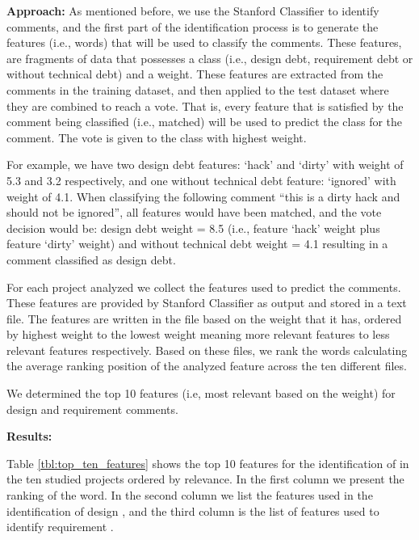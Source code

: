 \vspace{1mm}
\noindent \textbf{Approach:} As mentioned before, we use the Stanford Classifier to identify \SATD comments, and the first part of the identification process is to generate the features (i.e., words) that will be used to classify the comments. These features, are fragments of data that possesses a class (i.e., design debt, requirement debt or without technical debt) and a weight. These features are extracted from the comments in the training dataset, and then applied to the test dataset where they are combined to reach a vote. That is, every feature that is satisfied by the comment being classified (i.e., matched) will be used to predict the class for the comment. The vote is given to the class with highest weight. 

For example, we have two design debt features: `hack' and `dirty' with weight of 5.3 and 3.2 respectively, and one without technical debt feature: `ignored' with weight of 4.1. When classifying the following comment ``this is a dirty hack and should not be ignored'', all features would have been matched, and the vote decision would be: design debt weight = 8.5 (i.e., feature `hack' weight plus feature `dirty' weight) and without technical debt weight = 4.1 resulting in a comment classified as design debt.

For each project analyzed we collect the features used to predict the \SATD comments. These features are provided by Stanford Classifier as output and stored in a text file. The features are written in the file based on the weight that it has, ordered by highest weight to the lowest weight meaning more relevant features to less relevant features respectively. Based on these files, we rank the words calculating the average ranking position of the analyzed feature across the ten different files. 

We determined the top 10 features (i.e, most relevant based on the weight) for design and requirement \SATD comments.

\vspace{1mm}
\noindent \textbf{Results:} 

Table \ref{tbl:top_ten_features} shows the top 10 features for the identification of \SATD in the ten studied projects ordered by relevance. In the first column we present the ranking of the word. In the second column we list the features used in the identification of design \SATD, and the third column is the list of features used to identify requirement \SATD.

